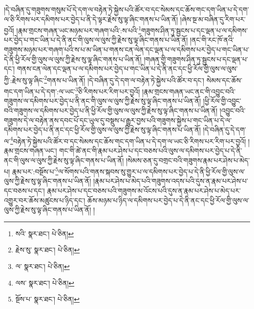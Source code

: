 །དེ་བཞིན་དུ་གཟུགས་གསུམ་པོ་དེ་དག་ལ་བརྟེན་ཏེ་སྐྱེས་པའི་ཚོར་བ་དང་སེམས་དང་ཆོས་གང་དག་ཡིན་པ་དེ་དག་ལ་ཅི་རིགས་པར་དམིགས་པར་བྱེད་པ་ནི་དེ་ལྟར་རྗེས་སུ་ལྟ་ཞིང་གནས་པ་ཡིན་ནོ། །ཞེས་སྔ་མ་བཞིན་དུ་རིག་པར་བྱའོ། །རྣམ་གྲངས་གཞན་ཡང་མཉམ་པར་གཞག་པའི་:ས་པའི་\footnote{སའི་  སྣར་ཐང་།  པེ་ཅིན། }གཟུགས་ཤིན་ཏུ་སྦྱངས་པ་དང་ལྡན་པ་ལ་དམིགས་པར་བྱེད་པ་གང་ཡིན་པ་དེ་ནི་ནང་གི་ལུས་ལ་ལུས་ཀྱི་རྗེས་སུ་ལྟ་ཞིང་གནས་པ་ཡིན་ནོ། །ནང་གི་རང་ཁོ་ནའི་གཟུགས་མཉམ་པར་གཞག་པའི་ས་པ་མ་ཡིན་པ་གནས་ངན་ལེན་དང་ལྡན་པ་ལ་དམིགས་པར་བྱེད་པ་གང་ཡིན་པ་དེ་ནི་ཕྱི་རོལ་གྱི་ལུས་ལ་ལུས་ཀྱི་རྗེས་སུ་ལྟ་ཞིང་གནས་པ་ཡིན་ནོ། །གཞན་གྱི་གཟུགས་ཤིན་ཏུ་སྦྱངས་པ་དང་ལྡན་པ་དང་། གནས་ངན་ལེན་དང་ལྡན་པ་ལ་དམིགས་པར་བྱེད་པ་གང་ཡིན་པ་དེ་ནི་ནང་དང་ཕྱི་རོལ་གྱི་ལུས་ལ་ལུས་ཀྱི་:རྗེས་སུ་ལྟ་ཞིང་\footnote{རྗེས་སུ་  སྣར་ཐང་།  པེ་ཅིན། }གནས་པ་ཡིན་ནོ། །དེ་བཞིན་དུ་དེ་དག་ལ་བརྟེན་ཏེ་སྐྱེས་པའི་ཚོར་བ་དང་། སེམས་དང་ཆོས་གང་དག་ཡིན་པ་དེ་དག་:ལ་ཡང་\footnote{ལ་  སྣར་ཐང་།  པེ་ཅིན། }ཅི་རིགས་པར་རིག་པར་བྱའོ། །རྣམ་གྲངས་གཞན་ཡང་ནང་གི་འབྱུང་བའི་གཟུགས་ལ་དམིགས་པར་བྱེད་པ་ནི་ནང་གི་ལུས་ལ་ལུས་ཀྱི་རྗེས་སུ་ལྟ་ཞིང་གནས་པ་ཡིན་ནོ། །ཕྱི་རོལ་གྱི་འབྱུང་བའི་གཟུགས་ལ་དམིགས་པར་བྱེད་པ་ནི་ཕྱི་རོལ་གྱི་ལུས་ལ་ལུས་ཀྱི་རྗེས་སུ་ལྟ་ཞིང་གནས་པ་ཡིན་ནོ། །འབྱུང་བའི་གཟུགས་དེ་ལ་བརྟེན་ནས་དབང་པོ་དང་ཡུལ་དུ་བསྡུས་པ་རྒྱུར་བྱས་པའི་གཟུགས་སྐྱེས་པ་གང་ཡིན་པ་དེ་ལ་དམིགས་པར་བྱེད་པ་ནི་ནང་དང་ཕྱི་རོལ་གྱི་ལུས་ལ་ལུས་ཀྱི་རྗེས་སུ་ལྟ་ཞིང་གནས་པ་ཡིན་ནོ། །དེ་བཞིན་དུ་དེ་དག་ལ་\footnote{ལས་  སྣར་ཐང་།  པེ་ཅིན། }བརྟེན་ཏེ་སྐྱེས་པའི་ཚོར་བ་དང་སེམས་དང་ཆོས་གང་དག་ཡིན་པ་དེ་དག་ལ་ཡང་ཅི་རིགས་པར་རིག་པར་བྱའོ། །རྣམ་གྲངས་གཞན་ཡང་། གང་གི་ཚེ་ནང་གི་རྣམ་པར་ཤེས་པ་དང་བཅས་པའི་ལུས་ལ་དམིགས་པར་བྱེད་པ་དེ་ནི་ནང་གི་ལུས་ལ་ལུས་ཀྱི་རྗེས་སུ་ལྟ་ཞིང་གནས་པ་ཡིན་ནོ། །སེམས་ཅན་དུ་བགྲང་བའི་གཟུགས་རྣམ་པར་ཤེས་པ་མེད་པ། རྣམ་པར་:བསྔོས་པ་\footnote{སྔོས་པ་  སྣར་ཐང་།  པེ་ཅིན། }ལ་སོགས་པའི་གནས་སྐབས་སུ་གྱུར་པ་ལ་དམིགས་པར་བྱེད་པ་དེ་ནི་ཕྱི་རོལ་གྱི་ལུས་ལ་ལུས་ཀྱི་རྗེས་སུ་ལྟ་ཞིང་གནས་པ་ཡིན་ནོ། །རྣམ་པར་ཤེས་པ་མེད་པའི་གཟུགས་འདས་པའི་དུས་ན་རྣམ་པར་ཤེས་པ་དང་བཅས་པ་དང་། རྣམ་པར་ཤེས་པ་དང་བཅས་པའི་གཟུགས་མ་འོངས་པའི་དུས་ན་རྣམ་པར་ཤེས་པ་མེད་པར་འགྱུར་བར་ཆོས་མཚུངས་པ་ཉིད་དང་། ཆོས་མཉམ་པ་ཉིད་ལ་དམིགས་པར་བྱེད་པ་དེ་ནི་ནང་དང་ཕྱི་རོལ་གྱི་ལུས་ལ་ལུས་ཀྱི་རྗེས་སུ་ལྟ་ཞིང་གནས་པ་ཡིན་ནོ། །
